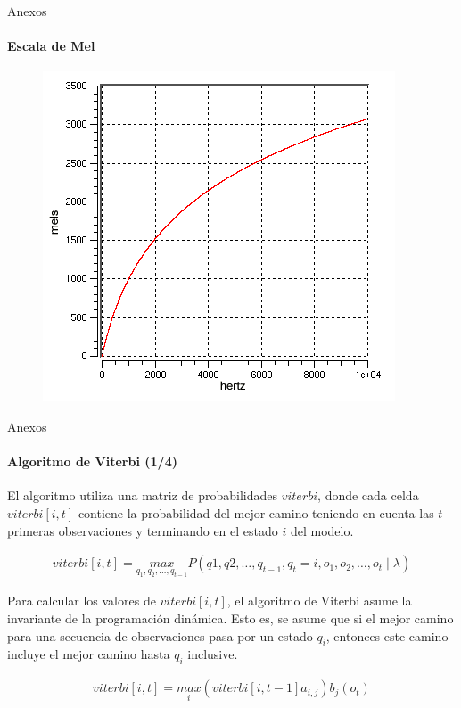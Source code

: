 \begin{frame}[noframenumbering]{Anexos}
\framesubtitle{Escala de Mel}
\begin{figure}[H]
\centering
\includegraphics[width=0.7\linewidth]{./graphics/mel_hz.png}
\end{figure} 
\end{frame}

\begin{frame}[noframenumbering]{Anexos}
\framesubtitle{Algoritmo de Viterbi (1/4)}
El algoritmo utiliza una matriz de probabilidades $viterbi$, donde cada celda $viterbi[i,t]$ 
contiene la probabilidad del mejor camino teniendo en cuenta las $t$ primeras observaciones y 
terminando en el estado $i$ del modelo.

\begin{align*}
    viterbi[i,t] = \displaystyle \underset{q_1,q_2,\ldots,q_{t - 1}}{max} P(q1,q2,\ldots,q_{t - 1},
        q_t = i,o_1,o_2,\ldots,o_t \mid \lambda)    
\end{align*} 

Para calcular los valores de $viterbi[i,t]$, el algoritmo de Viterbi asume la invariante de la 
programaci\'on din\'amica. Esto es, se asume que si el mejor camino para una secuencia de observaciones 
pasa por un estado $q_i$, entonces este camino incluye el mejor camino hasta $q_i$ inclusive. 


\begin{align*}
    viterbi[i,t] = \displaystyle \underset{i}{max} (viterbi[i,t-1]a_{i,j})b_j(o_t)
\end{align*}

\end{frame}

